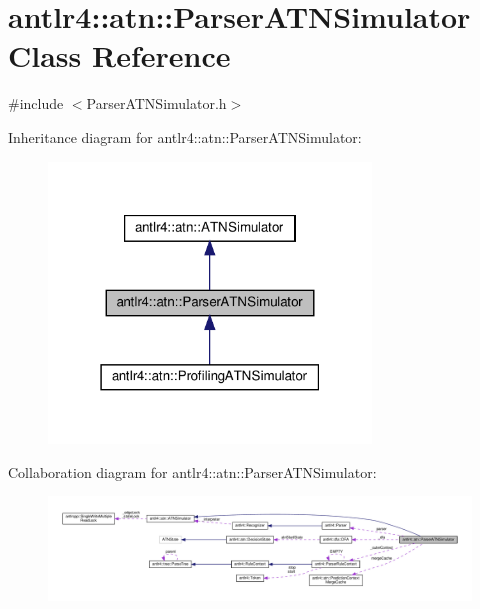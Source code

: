 \hypertarget{classantlr4_1_1atn_1_1ParserATNSimulator}{}\section{antlr4\+:\+:atn\+:\+:Parser\+A\+T\+N\+Simulator Class Reference}
\label{classantlr4_1_1atn_1_1ParserATNSimulator}


{\ttfamily \#include $<$Parser\+A\+T\+N\+Simulator.\+h$>$}



Inheritance diagram for antlr4\+:\+:atn\+:\+:Parser\+A\+T\+N\+Simulator\+:
\nopagebreak
\begin{figure}[H]
\begin{center}
\leavevmode
\includegraphics[width=243pt]{classantlr4_1_1atn_1_1ParserATNSimulator__inherit__graph}
\end{center}
\end{figure}


Collaboration diagram for antlr4\+:\+:atn\+:\+:Parser\+A\+T\+N\+Simulator\+:
\nopagebreak
\begin{figure}[H]
\begin{center}
\leavevmode
\includegraphics[width=350pt]{classantlr4_1_1atn_1_1ParserATNSimulator__coll__graph}
\end{center}
\end{figure}
